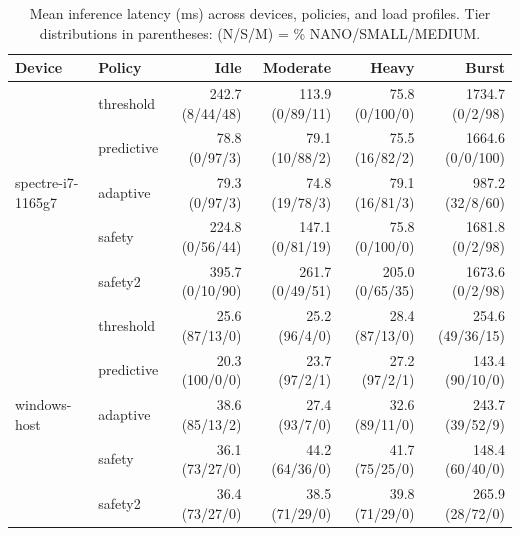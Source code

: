 \begin{table}[t]
\centering
\caption{Mean inference latency (ms) across devices, policies, and load profiles. Tier distributions in parentheses: (N/S/M) = \% NANO/SMALL/MEDIUM.}
\label{tab:multidevice}
\begin{tabular}{llrrrr}
\toprule
Device & Policy & Idle & Moderate & Heavy & Burst \\
\midrule
\multirow{5}{*}{spectre-i7-1165g7} & threshold & 242.7 (8/44/48) & 113.9 (0/89/11) & 75.8 (0/100/0) & 1734.7 (0/2/98) \\
 & predictive & 78.8 (0/97/3) & 79.1 (10/88/2) & 75.5 (16/82/2) & 1664.6 (0/0/100) \\
 & adaptive & 79.3 (0/97/3) & 74.8 (19/78/3) & 79.1 (16/81/3) & 987.2 (32/8/60) \\
 & safety & 224.8 (0/56/44) & 147.1 (0/81/19) & 75.8 (0/100/0) & 1681.8 (0/2/98) \\
 & safety2 & 395.7 (0/10/90) & 261.7 (0/49/51) & 205.0 (0/65/35) & 1673.6 (0/2/98) \\
\midrule
\multirow{5}{*}{windows-host} & threshold & 25.6 (87/13/0) & 25.2 (96/4/0) & 28.4 (87/13/0) & 254.6 (49/36/15) \\
 & predictive & 20.3 (100/0/0) & 23.7 (97/2/1) & 27.2 (97/2/1) & 143.4 (90/10/0) \\
 & adaptive & 38.6 (85/13/2) & 27.4 (93/7/0) & 32.6 (89/11/0) & 243.7 (39/52/9) \\
 & safety & 36.1 (73/27/0) & 44.2 (64/36/0) & 41.7 (75/25/0) & 148.4 (60/40/0) \\
 & safety2 & 36.4 (73/27/0) & 38.5 (71/29/0) & 39.8 (71/29/0) & 265.9 (28/72/0) \\
\bottomrule
\end{tabular}
\end{table}